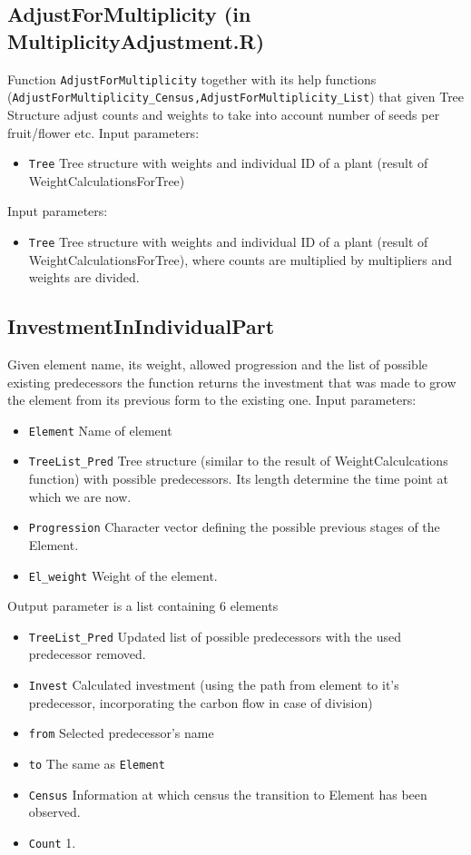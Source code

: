 \documentclass[10pt]{book} %
\begin{document}
\subsection*{AdjustForMultiplicity (in MultiplicityAdjustment.R)}
Function \texttt{AdjustForMultiplicity} together with its help functions (\texttt{AdjustForMultiplicity\_Census,AdjustForMultiplicity\_List}) that given Tree Structure adjust counts and weights to take into account number of seeds per fruit/flower etc.
Input parameters:
\begin{itemize}
\item \texttt{Tree}  Tree structure with weights and individual ID of a plant (result of WeightCalculationsForTree)
\end{itemize}
Input parameters:
\begin{itemize}
\item \texttt{Tree}  Tree structure with weights and individual ID of a plant (result of WeightCalculationsForTree), where counts are multiplied by multipliers and weights are divided.
\end{itemize}




\subsection*{InvestmentInIndividualPart}
Given element name, its weight, allowed progression and the list of possible existing predecessors the function returns the investment  that was made to grow the element from its previous form to the existing one.
Input parameters:
\begin{itemize}
\item \texttt{Element}  Name of element
\item \texttt{TreeList\_Pred}  Tree structure (similar to the result of WeightCalculcations function) with possible predecessors. Its length determine the time point at which we are now.
\item \texttt{Progression} Character vector defining the possible previous stages of the Element.
\item \texttt{El\_weight} Weight of the element.

\end{itemize}
Output parameter is a list containing 6 elements
\begin{itemize}
\item \texttt{TreeList\_Pred}  Updated list of possible predecessors with the used predecessor removed.
\item \texttt{Invest} Calculated investment (using the path from element to it's predecessor, incorporating the carbon flow in case of division)
\item \texttt{from} Selected predecessor's name
\item \texttt{to} The same as  \texttt{Element}
\item \texttt{Census} Information at which census the transition to Element has been observed.
\item \texttt{Count} 1.
\end{itemize}
\end{document}

